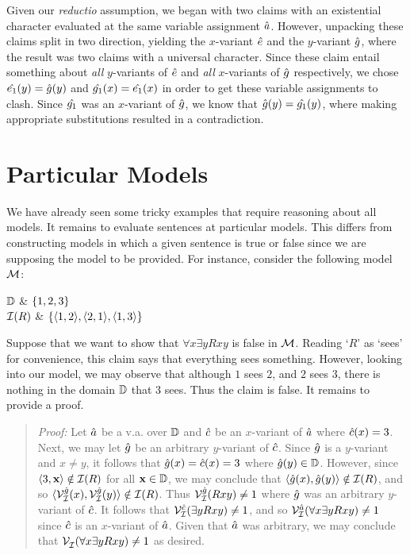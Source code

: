 Given our \textit{reductio} assumption, we began with two claims with an existential character evaluated at the same variable assignment $\hat{a}$.
However, unpacking these claims split in two direction, yielding the $x$-variant $\hat{e}$ and the $y$-variant $\hat{g}$, where the result was two claims with a universal character.
Since these claim entail something about \textit{all} $y$-variants of $\hat{e}$ and \textit{all} $x$-variants of $\hat{g}$ respectively, we chose $\hat{e_1}(y)=\hat{g}(y)$ and $\hat{g_1}(x)=\hat{e_1}(x)$ in order to get these variable assignments to clash. 
Since $\hat{g_1}$ was an $x$-variant of $\hat{g}$, we know that $\hat{g}(y)=\hat{g_1}(y)$, where making appropriate substitutions resulted in a contradiction.





\section{Particular Models}
  \label{sec:ParticularModels}

We have already seen some tricky examples that require reasoning about all models.
It remains to evaluate sentences at particular models.
This differs from constructing models in which a given sentence is true or false since we are supposing the model to be provided.
For instance, consider the following model $\mathcal{M}$:

\begin{partialmodel}
	$\mathbb{D}$			& $\lbrace1,2,3\rbrace$ \\
	$\mathcal{I}(R)$	  & $\lbrace\langle1,2\rangle,\langle2,1\rangle,\langle1,3\rangle\rbrace$ \\
\end{partialmodel}

Suppose that we want to show that $\forall x\exists y Rxy$ is false in $\mathcal{M}$.
Reading `$R$' as `sees' for convenience, this claim says that everything sees something.
However, looking into our model, we may observe that although $1$ sees $2$, and $2$ sees $3$, there is nothing in the domain $\mathbb{D}$ that $3$ sees.
Thus the claim is false.
It remains to provide a proof.

\begin{quote}
\label{somemodel1}
  \textit{Proof:}
  Let $\hat{a}$ be a v.a. over $\mathbb{D}$ and $\hat{c}$ be an $x$-variant of $\hat{a}$ where $\hat{c}(x)=3$.
  Next, we may let $\hat{g}$ be an arbitrary $y$-variant of $\hat{c}$.
  Since $\hat{g}$ is a $y$-variant and $x\neq y$, it follows that $\hat{g}(x)=\hat{c}(x)=3$ where $\hat{g}(y)\in\mathbb{D}$.
  However, since $\langle3,\mathbf{x}\rangle\notin\mathcal{I}(R)$ for all $\mathbf{x}\in\mathbb{D}$, we may conclude that $\langle\hat{g}(x),\hat{g}(y)\rangle\notin\mathcal{I}(R)$, and so $\langle\mathcal{V}_{\mathcal{I}}^{\hat{g}}(x),\mathcal{V}_{\mathcal{I}}^{\hat{g}}(y)\rangle\notin\mathcal{I}(R)$. 
  Thus $\mathcal{V}_{\mathcal{I}}^{\hat{g}}(Rxy)\neq 1$ where $\hat{g}$ was an arbitrary $y$-variant of $\hat{c}$.
  It follows that $\mathcal{V}_{\mathcal{I}}^{\hat{c}}(\exists yRxy)\neq 1$, and so $\mathcal{V}_{\mathcal{I}}^{\hat{a}}(\forall x\exists yRxy)\neq 1$ since $\hat{c}$ is an $x$-variant of $\hat{a}$.
  Given that $\hat{a}$ was arbitrary, we may conclude that $\mathcal{V}_{\mathcal{I}}^{}(\forall x\exists yRxy)\neq 1$ as desired. 
\end{quote}

